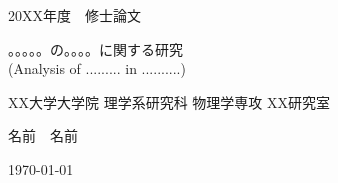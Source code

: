 \begin{titlepage}
    \begin{center}        
        \vspace*{3cm}
        
        {\Large 20XX年度　修士論文}
        \vspace{5cm}
 
        {\Large 。。。。。の。。。。に関する研究\\}
        \vspace{0.5cm}
        {\fontsize{15pt}{0cm}\selectfont (Analysis of ......... in ..........)}
        
        
        \vspace{5cm}
        
        \vfill
        
        {\large XX大学大学院 理学系研究科 物理学専攻 XX研究室}
        
        \vspace{0.5cm}
        {\Large 名前　名前}
        
        \vspace{1cm}
        {\Large \today}
        
    \end{center}
\end{titlepage}
\restoregeometry